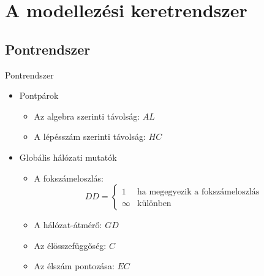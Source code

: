 \section{A modellezési keretrendszer}

\iffalse
  \subsection{Tervezési szempontok}
  \begin{frame}{Tervezési szempontok}
    \todo
  \end{frame}
\fi

  \subsection{Pontrendszer}
  \begin{frame}{Pontrendszer}
    \begin{itemize}
      \item<1-> Pontpárok
      \begin{itemize}
        \item<3-> Az algebra szerinti távolság: $AL$
        \item<4-> A lépésszám szerinti távolság: $HC$
      \end{itemize}
      \item<2-> Globális hálózati mutatók
      \begin{itemize}
        \item<5-> A fokszámeloszlás: $$DD =
    \begin{cases}
      1 & \text{ha megegyezik a fokszámeloszlás}\\
      \infty & \text{különben}
    \end{cases}$$
        \item<6-> A hálózat-átmérő: $GD$
        \item<7-> Az élösszefüggőség: $C$
        \item<8-> Az élszám pontozása: $EC$
      \end{itemize}
    \end{itemize}
  \end{frame}

